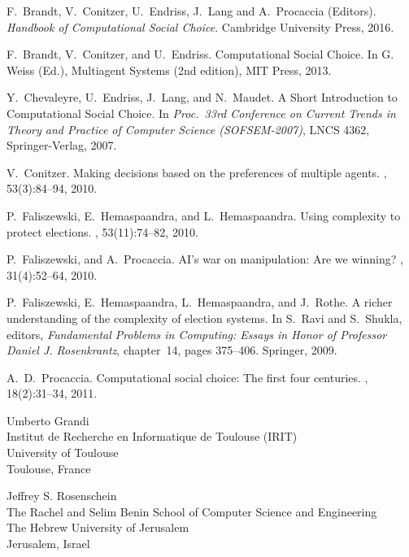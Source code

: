 \documentclass{comsoc2016}
\begin{document}
\begin{thebibliography}{1}

F.~Brandt, V.~Conitzer, U.~Endriss, J.~Lang and A.~Procaccia (Editors).
\newblock \emph{Handbook of Computational Social Choice}.
\newblock Cambridge University Press, 2016.


F.~Brandt, V.~Conitzer, and U.~Endriss.
\newblock Computational Social Choice. 
\newblock In G. Weiss (Ed.), Multiagent Systems (2nd edition), MIT Press, 2013.


Y.~Chevaleyre, U.~Endriss, J.~Lang, and N.~Maudet. 
A Short Introduction to Computational Social Choice. 
In \emph{Proc.\ 33rd Conference on Current Trends in 
Theory and Practice of Computer Science (SOFSEM-2007)}, 
LNCS 4362, Springer-Verlag, 2007.


V.~Conitzer.
\newblock Making decisions based on the preferences of multiple agents.
, 53(3):84--94, 2010.


P.~Faliszewski, E.~Hemaspaandra, and L.~Hemaspaandra.
\newblock Using complexity to protect elections.
, 53(11):74--82, 2010.

P.~Faliszewski, and A.~Procaccia.
\newblock AI's war on manipulation: Are we winning?
, 31(4):52--64, 2010.


P.~Faliszewski, E.~Hemaspaandra, L.~Hemaspaandra, and J.~Rothe.
\newblock A richer understanding of the complexity of election systems.
\newblock In S.~Ravi and S.~Shukla, editors, {\em Fundamental Problems in
  Computing: {Essays} in Honor of {Professor} {Daniel} {J.} {Rosenkrantz}},
  chapter~14, pages 375--406. Springer, 2009.

A.~D.~Procaccia.
\newblock Computational social choice: The first four centuries.
, 18(2):31--34, 2011.



\end{thebibliography}



\begin{contact}
Umberto Grandi\\
Institut de Recherche en Informatique de Toulouse (IRIT)\\
University of Toulouse\\
Toulouse, France\\
\end{contact}

\begin{contact}
Jeffrey S. Rosenschein\\
The Rachel and Selim Benin School of Computer Science and Engineering \\
The Hebrew University of Jerusalem  \\
Jerusalem, Israel\\
\end{contact}

\end{document}
